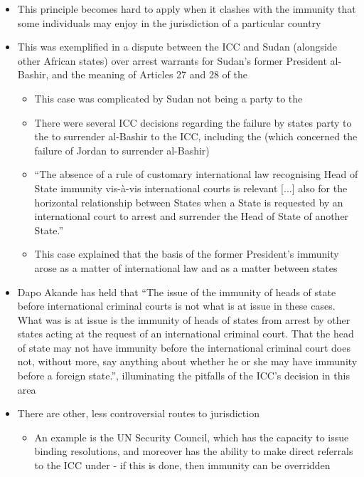 \begin{itemize}
    \item This principle becomes hard to apply when it clashes with the immunity that some individuals may enjoy in the jurisdiction of a particular country
    \item This was exemplified in a dispute between the ICC and Sudan (alongside other African states) over arrest warrants for Sudan's former President al-Bashir, and the meaning of Articles 27 and 28 of the 
    \begin{itemize}
        \item This case was complicated by Sudan not being a party to the 
        \item There were several ICC decisions regarding the failure by states party to the  to surrender al-Bashir to the ICC, including the  (which concerned the failure of Jordan to surrender al-Bashir)
        \item ``The absence of a rule of customary international law recognising Head of State immunity vis-à-vis international courts is relevant [...] also for the horizontal relationship between States when a State is requested by an international court to arrest and surrender the Head of State of another State.''
        \item This case explained that the basis of the former President's immunity arose as a matter of international law and as a matter between states
    \end{itemize}
    \item Dapo Akande has held that ``The issue of the immunity of heads of state before international criminal courts is not what is at issue in these cases. What was is at issue is the immunity of heads of states from arrest by other states acting at the request of an international criminal court. That the head of state may not have immunity before the international criminal court does not, without more, say anything about whether he or she may have immunity before a foreign state.'', illuminating the pitfalls of the ICC's decision in this area
    \item There are other, less controversial routes to jurisdiction
    \begin{itemize}
        \item An example is the UN Security Council, which has the capacity to issue binding resolutions, and moreover has the ability to make direct referrals to the ICC under  - if this is done, then immunity can be overridden
    \end{itemize}
\end{itemize}

